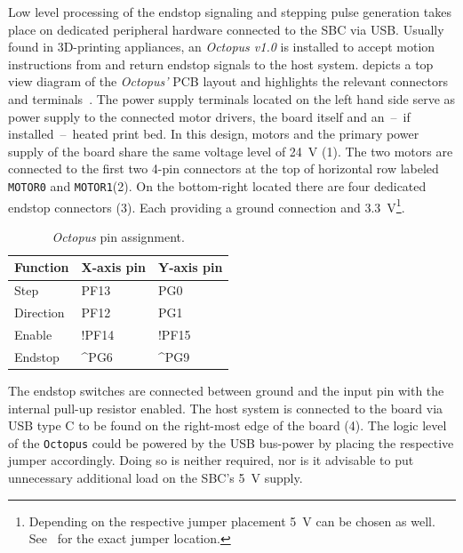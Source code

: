             Low level processing of the endstop signaling and stepping pulse generation takes place on dedicated peripheral hardware connected to the SBC via USB.
            Usually found in 3D-printing appliances, an \textit{Octopus v1.0} is installed to accept motion instructions from and return endstop signals to the host system.
             depicts a top view diagram of the \textit{Octopus'} PCB layout and highlights the relevant connectors and terminals~\cite{Manual.BigTreeTechOctopus}.
            The power supply terminals located on the left hand side serve as power supply to the connected motor drivers, the board itself and an~--~if installed~--~heated print bed.
            In this design, motors and the primary power supply of the board share the same voltage level of \qty{24}{\volt} (1).
            The two motors are connected to the first two 4-pin connectors at the top of horizontal row labeled \texttt{MOTOR0} and \texttt{MOTOR1}(2).
            On the bottom-right located there are four dedicated endstop connectors (3).
            Each providing a ground connection and \qty{3.3}{\volt}\footnote{Depending on the respective jumper placement \qty{5}{\volt} can be chosen as well. See~\cite{Manual.BigTreeTechOctopus} for the exact jumper location.}.

            \begin{table}[h]
                \centering
                \caption[\textit{Octopus} pin assignment]{\textit{Octopus} pin assignment.}
                \label{tab:octopus pin assignments}
                \begin{tabular}{@{}lll@{}}
                    \toprule
                    Function&   X-axis pin& Y-axis pin\\
                    \midrule
                    Step&       PF13&   PG0\\
                    Direction&  PF12&   PG1\\
                    Enable&     !PF14&  !PF15\\
                    Endstop&    \textasciicircum PG6&   \textasciicircum PG9\\
                    \bottomrule
                \end{tabular}
            \end{table}

            The endstop switches are connected between ground and the input pin with the internal pull-up resistor enabled.
            The host system is connected to the board via USB type C to be found on the right-most edge of the board (4).
            The logic level of the \texttt{Octopus} could be powered by the USB bus-power by placing the respective jumper accordingly.
            Doing so is neither required, nor is it advisable to put unnecessary additional load on the SBC's \qty{5}{\volt} supply.

